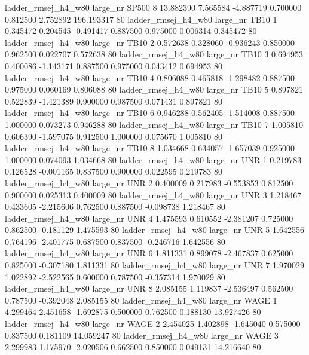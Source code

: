 ladder_rmsej_h4_w80   large_nr    SP500                 8 13.882390  7.565584  -4.887719 0.700000 0.812500  2.752892  196.193317 80
ladder_rmsej_h4_w80   large_nr     TB10                 1  0.345472  0.204545  -0.491417 0.887500 0.975000  0.006314    0.345472 80
ladder_rmsej_h4_w80   large_nr     TB10                 2  0.572638  0.328060  -0.936243 0.850000 0.962500  0.022707    0.572638 80
ladder_rmsej_h4_w80   large_nr     TB10                 3  0.694953  0.400086  -1.143171 0.887500 0.975000  0.043412    0.694953 80
ladder_rmsej_h4_w80   large_nr     TB10                 4  0.806088  0.465818  -1.298482 0.887500 0.975000  0.060169    0.806088 80
ladder_rmsej_h4_w80   large_nr     TB10                 5  0.897821  0.522839  -1.421389 0.900000 0.987500  0.071431    0.897821 80
ladder_rmsej_h4_w80   large_nr     TB10                 6  0.946288  0.562405  -1.514008 0.887500 1.000000  0.073273    0.946288 80
ladder_rmsej_h4_w80   large_nr     TB10                 7  1.005810  0.606390  -1.597075 0.912500 1.000000  0.075670    1.005810 80
ladder_rmsej_h4_w80   large_nr     TB10                 8  1.034668  0.634057  -1.657039 0.925000 1.000000  0.074093    1.034668 80
ladder_rmsej_h4_w80   large_nr      UNR                 1  0.219783  0.126528  -0.001165 0.837500 0.900000  0.022595    0.219783 80
ladder_rmsej_h4_w80   large_nr      UNR                 2  0.400009  0.217983  -0.553853 0.812500 0.900000  0.025313    0.400009 80
ladder_rmsej_h4_w80   large_nr      UNR                 3  1.218467  0.433605  -2.215606 0.762500 0.887500 -0.098738    1.218467 80
ladder_rmsej_h4_w80   large_nr      UNR                 4  1.475593  0.610552  -2.381207 0.725000 0.862500 -0.181129    1.475593 80
ladder_rmsej_h4_w80   large_nr      UNR                 5  1.642556  0.764196  -2.401775 0.687500 0.837500 -0.246716    1.642556 80
ladder_rmsej_h4_w80   large_nr      UNR                 6  1.811331  0.899078  -2.467837 0.625000 0.825000 -0.307180    1.811331 80
ladder_rmsej_h4_w80   large_nr      UNR                 7  1.970029  1.022892  -2.522565 0.600000 0.787500 -0.357314    1.970029 80
ladder_rmsej_h4_w80   large_nr      UNR                 8  2.085155  1.119837  -2.536497 0.562500 0.787500 -0.392048    2.085155 80
ladder_rmsej_h4_w80   large_nr     WAGE                 1  4.299464  2.451658  -1.692875 0.500000 0.762500  0.188130   13.927426 80
ladder_rmsej_h4_w80   large_nr     WAGE                 2  2.454025  1.402898  -1.645040 0.575000 0.837500  0.181109   14.059247 80
ladder_rmsej_h4_w80   large_nr     WAGE                 3  2.299983  1.175970  -2.020506 0.662500 0.850000  0.049131   14.216640 80
